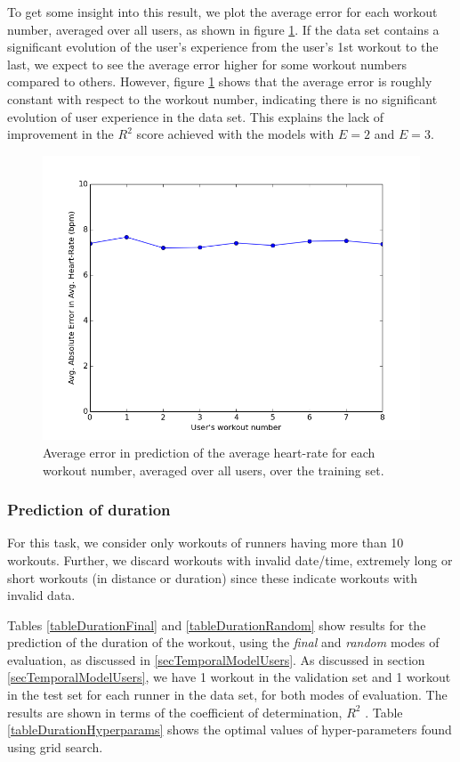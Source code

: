 \documentclass{acm_proc_article-sp}
\begin{document}
To get some insight into this result, we plot the average error for each workout number, averaged over all users, as shown in figure \ref{figAvgHrAvgErrorE1}. If the data set contains a significant evolution of the user's experience from the user's 1st workout to the last, we expect to see the average error higher for some workout numbers compared to others. However, figure \ref{figAvgHrAvgErrorE1} shows that the average error is roughly constant with respect to the workout number, indicating there is no significant evolution of user experience in the data set. This explains the lack of improvement in the $R^2$ score achieved with the models with $E = 2$ and $E = 3$.

\begin{figure}[h]
\centering
\includegraphics[scale=0.35]{../src/plots/avghr_error_vs_workout_E1}
\caption{\label{figAvgHrAvgErrorE1}  Average error in prediction of the average heart-rate for each workout number, averaged over all users, over the training set.}
\end{figure}

\subsubsection{Prediction of duration}

For this task, we consider only workouts of runners having more than 10 workouts. Further, we discard workouts with invalid date/time, extremely long or short workouts (in distance or duration) since these indicate workouts with invalid data.

Tables \ref{tableDurationFinal} and \ref{tableDurationRandom} show results for the prediction of the duration of the workout, using the  \emph{final} and \emph{random} modes of evaluation, as discussed in \ref{secTemporalModelUsers}. As discussed in section \ref{secTemporalModelUsers}, we have 1 workout in the validation set and 1 workout in the test set for each runner in the data set, for both modes of evaluation. The results are shown in terms of the coefficient of determination, $R^2$ \cite{r2Wiki}. Table \ref{tableDurationHyperparams} shows the optimal values of hyper-parameters found using grid search.
\end{document}
